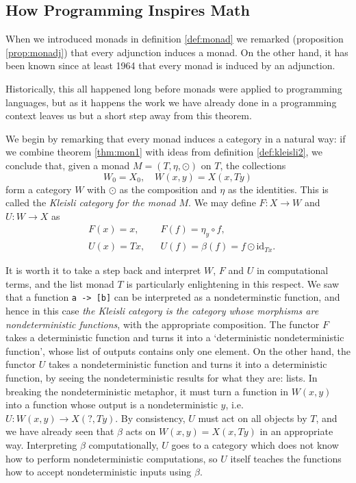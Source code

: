 \documentclass[11pt]{article}
\theoremstyle{nonumberplain}
\newcommand{\id}{\mathrm{id}}
\newcommand*\lsin{\lstinline}
\begin{document}
\subsection{How Programming Inspires Math}

When we introduced monads in definition \ref{def:monad} we remarked (proposition \ref{prop:monadj}) that every adjunction induces a monad. On the other hand, it has been known since at least 1964 \cite{kleisli} that every monad is induced by an adjunction.

Historically, this all happened long before monads were applied to programming languages, but as it happens the work we have already done in a programming context leaves us but a short step away from this theorem.

We begin by remarking that every monad induces a category in a natural way: if we combine theorem \ref{thm:mon1} with ideas from definition \ref{def:kleisli2}, we conclude that, given a monad $M = (T,\eta,\odot)$ on $T$, the collections
\begin{equation}
W_0 = X_0, \quad W(x,y) = X(x,Ty)
\end{equation}
form a category $W$ with $\odot$ as the composition and $\eta$ as the identities. This is called the \emph{Kleisli category for the monad $M$}. We may define $F \colon X \to W$ and $U \colon W \to X$ as
\begin{equation}\label{eq:fudef}
\begin{aligned}
&F(x) = x, && F(f) = \eta_y \circ f,\\
&U(x) = Tx, && U(f) = \beta(f) = f \odot \id_{Tx}.
\end{aligned}
\end{equation}

It is worth it to take a step back and interpret $W$, $F$ and $U$ in computational terms, and the list monad $T$ is particularly enlightening in this respect. We saw that a function \lsin|a -> [b]| can be interpreted as a nondeterminstic function, and hence in this case \emph{the Kleisli category is the category whose morphisms are nondeterministic functions}, with the appropriate composition. The functor $F$ takes a deterministic function and turns it into a `deterministic nondeterministic function', whose list of outputs contains only one element. On the other hand, the functor $U$ takes a nondeterministic function and turns it into a deterministic function, by seeing the nondeterministic results for what they are: lists. In breaking the nondeterministic metaphor, it must turn a function in $W(x,y)$ into a function whose output is a nondeterministic $y$, i.e. $U \colon W(x,y) \to X(?, Ty)$. By consistency, $U$ must act on all objects by $T$, and we have already seen that $\beta$ acts on $W(x,y) = X(x,Ty)$ in an appropriate way. Interpreting $\beta$ computationally, $U$ goes to a category which does not know how to perform nondeterministic computations, so $U$ itself teaches the functions how to accept nondeterministic inputs using $\beta$.
\end{document}
